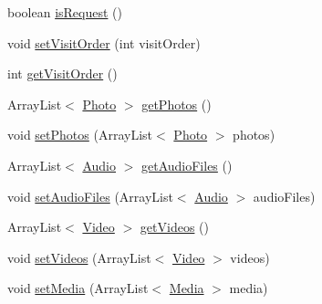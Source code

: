 \begin{DoxyCompactItemize}
\item 
boolean \hyperlink{classuk_1_1ac_1_1swan_1_1digitaltrails_1_1components_1_1_waypoint_a2659a3696f0cf8bc13a2a8661795da50}{is\+Request} ()
\item 
void \hyperlink{classuk_1_1ac_1_1swan_1_1digitaltrails_1_1components_1_1_waypoint_a82332d29178a2053df5fa26707da5ec4}{set\+Visit\+Order} (int visit\+Order)
\item 
int \hyperlink{classuk_1_1ac_1_1swan_1_1digitaltrails_1_1components_1_1_waypoint_ade139546ffb077af738b942221090136}{get\+Visit\+Order} ()
\item 
Array\+List$<$ \hyperlink{classuk_1_1ac_1_1swan_1_1digitaltrails_1_1components_1_1_photo}{Photo} $>$ \hyperlink{classuk_1_1ac_1_1swan_1_1digitaltrails_1_1components_1_1_waypoint_aae273590a2a2fd60fe0965e1c5b2e664}{get\+Photos} ()
\item 
void \hyperlink{classuk_1_1ac_1_1swan_1_1digitaltrails_1_1components_1_1_waypoint_a9008fb4e314b182eddbe890e2a7de475}{set\+Photos} (Array\+List$<$ \hyperlink{classuk_1_1ac_1_1swan_1_1digitaltrails_1_1components_1_1_photo}{Photo} $>$ photos)
\item 
Array\+List$<$ \hyperlink{classuk_1_1ac_1_1swan_1_1digitaltrails_1_1components_1_1_audio}{Audio} $>$ \hyperlink{classuk_1_1ac_1_1swan_1_1digitaltrails_1_1components_1_1_waypoint_a234fad771b83f70eab30181807302105}{get\+Audio\+Files} ()
\item 
void \hyperlink{classuk_1_1ac_1_1swan_1_1digitaltrails_1_1components_1_1_waypoint_ae682b911a4569349e367d77634b16ae6}{set\+Audio\+Files} (Array\+List$<$ \hyperlink{classuk_1_1ac_1_1swan_1_1digitaltrails_1_1components_1_1_audio}{Audio} $>$ audio\+Files)
\item 
Array\+List$<$ \hyperlink{classuk_1_1ac_1_1swan_1_1digitaltrails_1_1components_1_1_video}{Video} $>$ \hyperlink{classuk_1_1ac_1_1swan_1_1digitaltrails_1_1components_1_1_waypoint_a2922dd8817c461916fa8e37c072d16ee}{get\+Videos} ()
\item 
void \hyperlink{classuk_1_1ac_1_1swan_1_1digitaltrails_1_1components_1_1_waypoint_a1927101c806a3bd3b2808a064faf18ee}{set\+Videos} (Array\+List$<$ \hyperlink{classuk_1_1ac_1_1swan_1_1digitaltrails_1_1components_1_1_video}{Video} $>$ videos)
\item 
void \hyperlink{classuk_1_1ac_1_1swan_1_1digitaltrails_1_1components_1_1_waypoint_acab3311f6dffca7c7ae2d76a9a3a56f3}{set\+Media} (Array\+List$<$ \hyperlink{classuk_1_1ac_1_1swan_1_1digitaltrails_1_1components_1_1_media}{Media} $>$ media)
\item 

\end{DoxyCompactItemize}
